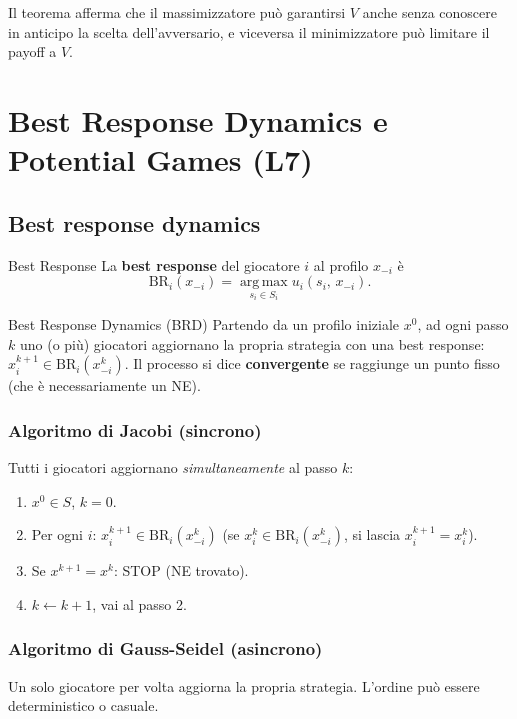 \documentclass[12pt,a4paper,twoside]{book}
\theoremstyle{plain}
\theoremstyle{definition}
\newcommand{\BR}{\mathrm{BR}}
\newcommand{\argmax}{\operatorname*{arg\,max}}
\begin{document}
Il teorema afferma che il massimizzatore può garantirsi $V$ anche senza conoscere in anticipo la scelta dell'avversario, e viceversa il minimizzatore può limitare il payoff a $V$.

\chapter{Best Response Dynamics e Potential Games (L7)}

\section{Best response dynamics}

\begin{defbox}{Best Response}
La \textbf{best response} del giocatore $i$ al profilo $x_{-i}$ è
\[
  \BR_i(x_{-i}) = \argmax_{s_i\in S_i} u_i(s_i,\, x_{-i}).
\]
\end{defbox}

\begin{defbox}{Best Response Dynamics (BRD)}
Partendo da un profilo iniziale $x^0$, ad ogni passo $k$ uno (o più) giocatori aggiornano la propria strategia con una best response: $x^{k+1}_i\in\BR_i(x^k_{-i})$. Il processo si dice \textbf{convergente} se raggiunge un punto fisso (che è necessariamente un NE).
\end{defbox}

\subsection{Algoritmo di Jacobi (sincrono)}
Tutti i giocatori aggiornano \emph{simultaneamente} al passo $k$:
\begin{enumerate}
  \item $x^0\in S$, $k=0$.
  \item Per ogni $i$: $x_i^{k+1}\in\BR_i(x^k_{-i})$ (se $x_i^k\in\BR_i(x^k_{-i})$, si lascia $x_i^{k+1}=x_i^k$).
  \item Se $x^{k+1}=x^k$: STOP (NE trovato).
  \item $k\leftarrow k+1$, vai al passo 2.
\end{enumerate}

\subsection{Algoritmo di Gauss-Seidel (asincrono)}
Un solo giocatore per volta aggiorna la propria strategia. L'ordine può essere deterministico o casuale.
\end{document}
